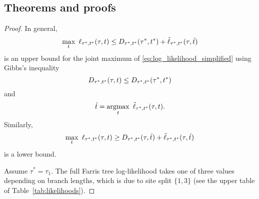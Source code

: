 \subsection*{Theorems and proofs}

\topoInconsist*

\begin{proof}
In general,
$$
\max_{t} \ \ell_{\tau^*,t^*}(\tau, t) \le
    \shannonDivergence_{\tau^*,t^*}(\tau^*,t^*)
    + \tilde{\ell}_{\tau^*,t^*}(\tau, \hat{t})
$$
is an upper bound for the joint maximum of \eqref{eq:log_likelihood_simplified} using Gibbs's inequality
$$
D_{\tau^*,t^*}(\tau,t) \le D_{\tau^*,t^*}(\tau^*,t^*)
$$
and
$$
\hat{t} = \argmax_{t} \ \tilde{\ell}_{\tau^*,t^*}(\tau, t).
$$
Similarly,
$$
\max_{t} \ \ell_{\tau^*,t^*}(\tau, t) \ge
    D_{\tau^*,t^*}(\tau,\hat{t})
    + \tilde{\ell}_{\tau^*,t^*}(\tau, \hat{t})
$$
is a lower bound.

Assume $\tau^*=\tau_1$.
The full Farris tree log-likelihood takes one of three values depending on branch lengths, which is due to site split $\{1,3\}$ (see the upper table of Table~\ref{tab:likelihoods}).


\end{proof}

